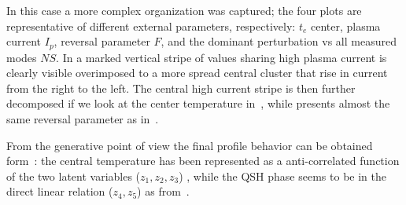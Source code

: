 In this case a more complex organization was captured; the four plots are representative of different external parameters, respectively: $t_e$ center, plasma current $I_p$, reversal parameter $F$, and the dominant perturbation vs all measured modes $NS$.
In \Figure{\ref{fig:VAE2_qsh_ls_preconditioned_b}} a marked vertical stripe of values sharing high plasma current is clearly visible overimposed to a more spread central cluster that rise in current from the right to the left. The central high current stripe is then further decomposed if we look at the center temperature in~\Figure{\ref{fig:VAE2_qsh_ls_preconditioned_a}}, while presents almost the same reversal parameter as in~\Figure{\ref{fig:VAE2_qsh_ls_preconditioned_c}}.

From the generative point of view the final profile behavior can be obtained form~\Figure{\ref{fig:VAE2_qsh_gen_prec_a}}: the central temperature has been represented as a anti-correlated function of the two latent variables ($z_1, z_2, z_3$) , while the QSH phase seems to be in the direct linear relation ($z_4,z_5$) as from~\Figure{\ref{fig:VAE2_qsh_gen_prec_b}}.

